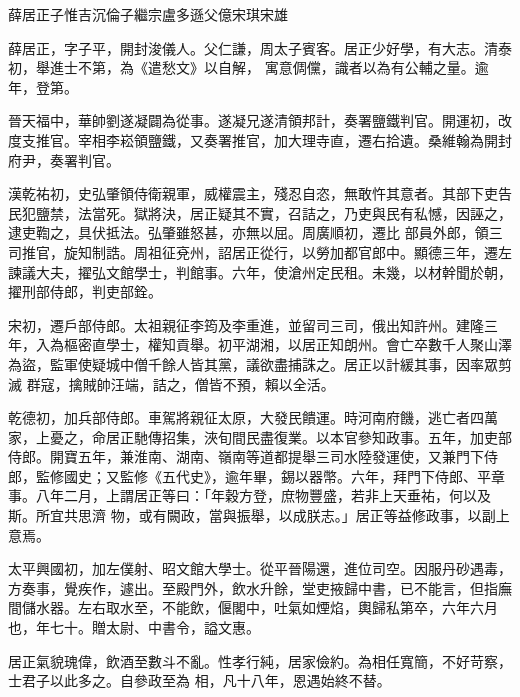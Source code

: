 
\begin{pinyinscope}

 薛居正子惟吉沉倫子繼宗盧多遜父億宋琪宋雄



 薛居正，字子平，開封浚儀人。父仁謙，周太子賓客。居正少好學，有大志。清泰初，舉進士不第，為《遣愁文》以自解，
 寓意倜儻，識者以為有公輔之量。逾年，登第。



 晉天福中，華帥劉遂凝闢為從事。遂凝兄遂清領邦計，奏署鹽鐵判官。開運初，改度支推官。宰相李崧領鹽鐵，又奏署推官，加大理寺直，遷右拾遺。桑維翰為開封府尹，奏署判官。



 漢乾祐初，史弘肇領侍衛親軍，威權震主，殘忍自恣，無敢忤其意者。其部下吏告民犯鹽禁，法當死。獄將決，居正疑其不實，召詰之，乃吏與民有私憾，因誣之，逮吏鞫之，具伏抵法。弘肇雖怒甚，亦無以屈。周廣順初，遷比
 部員外郎，領三司推官，旋知制誥。周祖征兗州，詔居正從行，以勞加都官郎中。顯德三年，遷左諫議大夫，擢弘文館學士，判館事。六年，使滄州定民租。未幾，以材幹聞於朝，擢刑部侍郎，判吏部銓。



 宋初，遷戶部侍郎。太祖親征李筠及李重進，並留司三司，俄出知許州。建隆三年，入為樞密直學士，權知貢舉。初平湖湘，以居正知朗州。會亡卒數千人聚山澤為盜，監軍使疑城中僧千餘人皆其黨，議欲盡捕誅之。居正以計緩其事，因率眾剪滅
 群寇，擒賊帥汪端，詰之，僧皆不預，賴以全活。



 乾德初，加兵部侍郎。車駕將親征太原，大發民饋運。時河南府饑，逃亡者四萬家，上憂之，命居正馳傳招集，浹旬間民盡復業。以本官參知政事。五年，加吏部侍郎。開寶五年，兼淮南、湖南、嶺南等道都提舉三司水陸發運使，又兼門下侍郎，監修國史；又監修《五代史》，逾年畢，錫以器幣。六年，拜門下侍郎、平章事。八年二月，上謂居正等曰：「年穀方登，庶物豐盛，若非上天垂祐，何以及斯。所宜共思濟
 物，或有闕政，當與振舉，以成朕志。」居正等益修政事，以副上意焉。



 太平興國初，加左僕射、昭文館大學士。從平晉陽還，進位司空。因服丹砂遇毒，方奏事，覺疾作，遽出。至殿門外，飲水升餘，堂吏掖歸中書，已不能言，但指廡間儲水器。左右取水至，不能飲，偃閣中，吐氣如煙焰，輿歸私第卒，六年六月也，年七十。贈太尉、中書令，謚文惠。



 居正氣貌瑰偉，飲酒至數斗不亂。性孝行純，居家儉約。為相任寬簡，不好苛察，士君子以此多之。自參政至為
 相，凡十八年，恩遇始終不替。




\end{pinyinscope}
